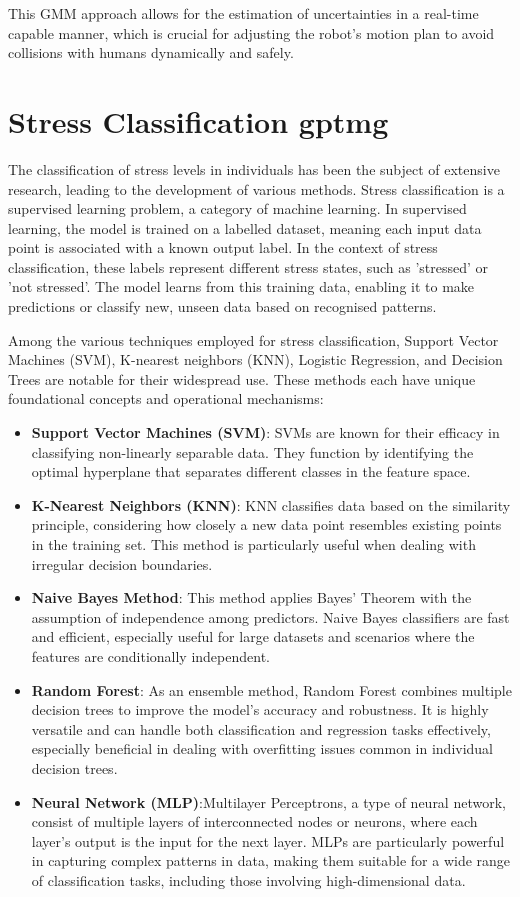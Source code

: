This GMM approach allows for the estimation of uncertainties in a real-time capable manner, which is crucial for adjusting the robot's motion plan to avoid collisions with humans dynamically and safely.


\section{Stress Classification \gls{gptmg}}
The classification of stress levels in individuals has been the subject of extensive research, leading to the development of various methods. Stress classification is a supervised learning problem, a category of machine learning. In supervised learning, the model is trained on a labelled dataset, meaning each input data point is associated with a known output label. In the context of stress classification, these labels represent different stress states, such as 'stressed' or 'not stressed'. The model learns from this training data, enabling it to make predictions or classify new, unseen data based on recognised patterns.

Among the various techniques employed for stress classification, Support Vector Machines (SVM), K-nearest neighbors (KNN), Logistic Regression, and Decision Trees are notable for their widespread use. These methods each have unique foundational concepts and operational mechanisms:

\begin{itemize}
    \item \textbf{Support Vector Machines (SVM)}: SVMs are known for their efficacy in classifying non-linearly separable data. They function by identifying the optimal hyperplane that separates different classes in the feature space.
    \item \textbf{K-Nearest Neighbors (KNN)}: KNN classifies data based on the similarity principle, considering how closely a new data point resembles existing points in the training set. This method is particularly useful when dealing with irregular decision boundaries.
    \item \textbf{Naive Bayes Method}: This method applies Bayes' Theorem with the assumption of independence among predictors. Naive Bayes classifiers are fast and efficient, especially useful for large datasets and scenarios where the features are conditionally independent.
    \item \textbf{Random Forest}: As an ensemble method, Random Forest combines multiple decision trees to improve the model's accuracy and robustness. It is highly versatile and can handle both classification and regression tasks effectively, especially beneficial in dealing with overfitting issues common in individual decision trees.
    \item \textbf{Neural Network (MLP)}:Multilayer Perceptrons, a type of neural network, consist of multiple layers of interconnected nodes or neurons, where each layer's output is the input for the next layer. MLPs are particularly powerful in capturing complex patterns in data, making them suitable for a wide range of classification tasks, including those involving high-dimensional data.
\end{itemize}

